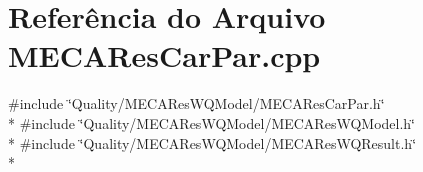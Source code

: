 \section{Referência do Arquivo M\+E\+C\+A\+Res\+Car\+Par.\+cpp}
\label{_m_e_c_a_res_car_par_8cpp}
{\ttfamily \#include \char`\"{}Quality/\+M\+E\+C\+A\+Res\+W\+Q\+Model/\+M\+E\+C\+A\+Res\+Car\+Par.\+h\char`\"{}}\\*
{\ttfamily \#include \char`\"{}Quality/\+M\+E\+C\+A\+Res\+W\+Q\+Model/\+M\+E\+C\+A\+Res\+W\+Q\+Model.\+h\char`\"{}}\\*
{\ttfamily \#include \char`\"{}Quality/\+M\+E\+C\+A\+Res\+W\+Q\+Model/\+M\+E\+C\+A\+Res\+W\+Q\+Result.\+h\char`\"{}}\\*
